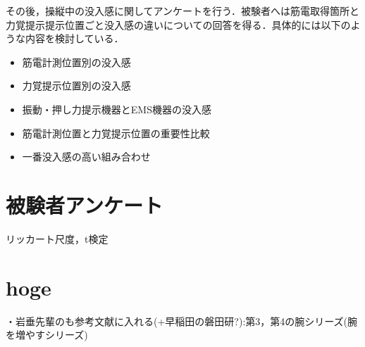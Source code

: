         その後，操縦中の没入感に関してアンケートを行う．被験者へは筋電取得箇所と力覚提示提示位置ごと没入感の違いについての回答を得る．具体的には以下のような内容を検討している．
        \begin{itemize}
        \item 筋電計測位置別の没入感
        \item 力覚提示位置別の没入感
        \item 振動・押し力提示機器とEMS機器の没入感
        \item 筋電計測位置と力覚提示位置の重要性比較
        \item 一番没入感の高い組み合わせ
        \end{itemize}
    
        
       
        
    \section{被験者アンケート}
    リッカート尺度，t検定
    
    

\section{hoge}        
        ・岩垂先輩のも参考文献に入れる(+早稲田の磐田研?):第3，第4の腕シリーズ(腕を増やすシリーズ) 

